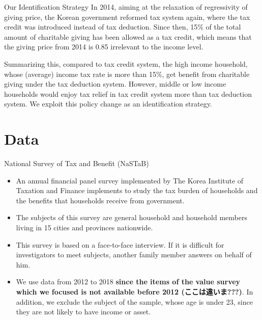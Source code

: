 \documentclass[
  ignorenonframetext,
]{beamer}
\providecommand{\tightlist}{%
  \setlength{\itemsep}{0pt}\setlength{\parskip}{0pt}}
\begin{document}
\begin{frame}{Our Identification Strategy}
\protect\hypertarget{our-identification-strategy}{}
In 2014, aiming at the relaxation of regressivity of giving price, the Korean government reformed tax system again, where the tax credit was introduced instead of tax deduction. Since then, 15\% of the total amount of charitable giving has been allowed as a tax credit, which means that the giving price from 2014 is 0.85 irrelevant to the income level.

Summarizing this, compared to tax credit system, the high income household, whose (average) income tax rate is more than 15\%, get benefit from charitable giving under the tax deduction system. However, middle or low income households would enjoy tax relief in tax credit system more than tax deduction system. We exploit this policy change as an identification strategy.
\end{frame}

\hypertarget{data}{%
\section{Data}\label{data}}

\begin{frame}{National Survey of Tax and Benefit (NaSTaB)}
\protect\hypertarget{national-survey-of-tax-and-benefit-nastab}{}
\begin{itemize}
\tightlist
\item
  An annual financial panel survey implemented by The Korea Institute of Taxation and Finance implements to study the tax burden of households and the benefits that households receive from government.
\item
  The subjects of this survey are general household and household members living in 15 cities and provinces nationwide.
\item
  This survey is based on a face-to-face interview. If it is difficult for investigators to meet subjects, another family member answers on behalf of him.
\item
  We use data from 2012 to 2018 \textbf{since the items of the value survey which we focused is not available before 2012 (ここは違いま???)}. In addition, we exclude the subject of the sample, whose age is under 23, since they are not likely to have income or asset.
\end{itemize}
\end{frame}
\end{document}
